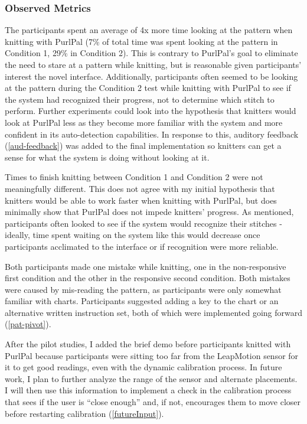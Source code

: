 \documentclass[11pt,twocolumn]{article}
\begin{document}
\subsubsection{Observed Metrics} \label{metrics}

The participants spent an average of 4x more time looking at the pattern when knitting with PurlPal (7\% of total time was spent looking at the pattern in Condition 1, 29\% in Condition 2).
This is contrary to PurlPal's goal to eliminate the need to stare at a pattern while knitting, but is reasonable given participants' interest the novel interface.
Additionally, participants often seemed to be looking at the pattern during the Condition 2 test while knitting with PurlPal to see if the system had recognized their progress, not to determine which stitch to perform.
Further experiments could look into the hypothesis that knitters would look at PurlPal less as they become more familiar with the system and more confident in its auto-detection capabilities.
In response to this, auditory feedback (\ref{aud-feedback}) was added to the final implementation so knitters can get a sense for what the system is doing without looking at it.

Times to finish knitting between Condition 1 and Condition 2 were not meaningfully different. This does not agree with my initial hypothesis that knitters would be able to work faster when knitting with PurlPal, but does minimally show that PurlPal does not impede knitters' progress.
As mentioned, participants often looked to see if the system would recognize their stitches - ideally, time spent waiting on the system like this would decrease once participants acclimated to the interface or if recognition were more reliable.

Both participants made one mistake while knitting, one in the non-responsive first condition and the other in the responsive second condition.
Both mistakes were caused by mis-reading the pattern, as participants were only somewhat familiar with charts.
Participants suggested adding a key to the chart or an alternative written instruction set, both of which were implemented going forward (\ref{pat-pivot}).

After the pilot studies, I added the brief demo before participants knitted with PurlPal because participants were sitting too far from the LeapMotion sensor for it to get good readings, even with the dynamic calibration process.
In future work, I plan to further analyze the range of the sensor and alternate placements.
I will then use this information to implement a check in the calibration process that sees if the user is ``close enough'' and, if not, encourages them to move closer before restarting calibration (\ref{futureInput}).
\end{document}
